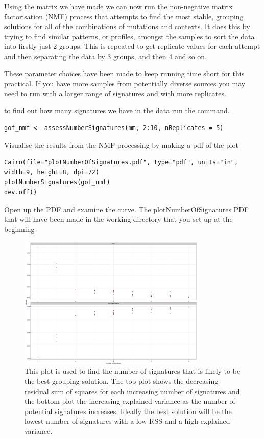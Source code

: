 Using the matrix we have made we can now run the non-negative matrix factorisation (NMF)
process that attempts to find the most stable, grouping solutions for all of the combinations
of mutations and contexts. It does this by trying to find similar patterns, or profiles,
amongst the samples to sort the data into firstly just 2 groups. This is repeated to get
replicate values for each attempt and then separating the data by 3 groups, and then 4 and so on.  
\vspace{4 mm}
\begin{note}
These parameter choices have been made to keep running time short for this practical.
If you have more samples from potentially diverse sources you may
need to run with a larger range of signatures and with more replicates.
\end{note}

\begin{steps}
to find out how many signatures we have in the data run the command.
\begin{lstlisting}
gof_nmf <- assessNumberSignatures(mm, 2:10, nReplicates = 5)
\end{lstlisting}

Visualise the results from the NMF processing by making a pdf of the plot
\begin{lstlisting}
Cairo(file="plotNumberOfSignatures.pdf", type="pdf", units="in", width=9, height=8, dpi=72)
plotNumberSignatures(gof_nmf)
dev.off()
\end{lstlisting}

Open up the PDF and examine the curve.
The plotNumberOfSignatures PDF that will have been made in the working directory that you set up at the beginning
\end{steps}

\begin{figure}[H]
\centering
\includegraphics[width=0.8\textwidth]{handout/numberofsignatures.png}
\caption{This plot is used to find the number of signatures that is likely
to be the best grouping solution. The top plot shows the decreasing residual
sum of squares for each increasing number of signatures and the bottom plot the
increasing explained variance as the number of potential signatures increases.
Ideally the best solution will be the lowest number of signatures with
a low RSS and a high explained variance.}
\label{Figure 1:Number of signatures plot}
\end{figure}

